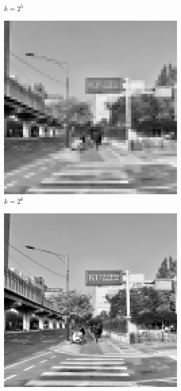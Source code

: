 \begin{figure}[H]
\begin{subfigure}[b]{0.3\textwidth}
        \caption{$k = 2^5$}
    \end{subfigure}
    \begin{subfigure}[b]{0.3\textwidth}
        \centering
        \includegraphics[width=\textwidth]{problem2/high_freq_64.bmp}
        \caption{$k = 2^6$}
    \end{subfigure}
    \hfill
    \begin{subfigure}[b]{0.3\textwidth}
        \centering
        \includegraphics[width=\textwidth]{problem2/high_freq_128.bmp}

\end{subfigure}
\end{figure}
